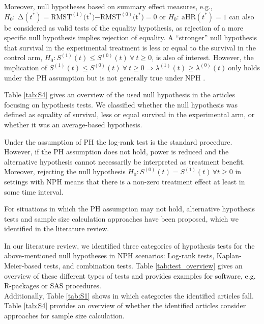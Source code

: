 \documentclass{article}
\newcommand{\NEW}[2][black]{\textcolor{#1}{#2}}
\begin{document}
\noindent Moreover, null hypotheses based on summary effect measures, e.g.,  $H_0:\ \mathrm{\Delta }\left(t^*\right)=\text{RMST}^{\left(1\right)}\mathrm{(}{\mathrm{t}}^{\mathrm{*}}\mathrm{)}\mathrm{-}\text{RMST}^{\left(0\right)}\mathrm{(}{\mathrm{t}}^{\mathrm{*}}\mathrm{)=}0$ or $H_0:\ \text{aHR}(t^*)=1$ can also be considered as valid tests of the equality hypothesis, as rejection of a more specific null hypothesis implies rejection of equality. A ``stronger'' null hypothesis that survival in the experimental treatment is less or equal to the survival in the control arm, $H_0:S^{\left(1\right)}\left(t\right)\le S^{\left(0\right)}\left(t\right)\ \forall \ t\ge 0$,  is also of interest. However, the implication of $S^{\left(1\right)}\left(t\right)\le S^{\left(0\right)}\left(t\right)\ \forall \ t\ge 0\Rightarrow {\lambda }^{\left(1\right)}\left(t\right)\geq {\lambda }^{\left(0\right)}\left(t\right)\ $only holds under the PH assumption but is not generally true under NPH \cite{Ristl.2021}.  

\noindent 
Table \ref{tab:S4} gives an overview of the used null hypothesis in the articles focusing on hypothesis tests.
We classified whether the null hypothesis was defined as equality of survival, less or equal survival in the experimental arm, or whether it was an average-based hypothesis.


\noindent 

\noindent Under the assumption of PH the log-rank test is the standard procedure. However, if the PH assumption does not hold, power is reduced and the alternative hypothesis cannot necessarily be interpreted as treatment benefit. %
Moreover, rejecting the null hypothesis $H_0:S^{\left(0\right)}\left(t\right)=S^{\left(1\right)}\left(t\right)\,\forall t\ge 0$ in settings with NPH means that there is a non-zero treatment effect at least in some time interval.  

\noindent For situations in which the PH assumption may not hold, alternative hypothesis tests and sample size calculation approaches have been proposed, which we identified in the literature review.

\noindent In our literature review, we identified three categories of hypothesis tests for the above-mentioned null hypotheses in NPH scenarios: Log-rank tests, Kaplan-Meier-based tests, and combination tests. 
Table \ref{tab:test_overview} gives an overview of these different types of tests \NEW{ and provides examples for software, e.g. R-packages or SAS procedures. }\\
Additionally, Table \ref{tab:S1} shows in which categories the identified articles fall. Table \ref{tab:S4} provides an overview of whether the identified articles consider approaches for sample size calculation. 
\end{document}
